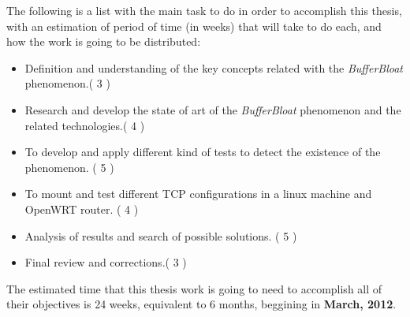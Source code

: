 The following is a list with the main task to do in order to accomplish this thesis, with an estimation of period of time (in weeks) that will take to do each, and how the work is going to be distributed:
\begin{itemize}
\item Definition and understanding of the key concepts related with the \textit{BufferBloat} phenomenon.( 3 )
\item Research and develop the state of art of the \textit{BufferBloat} phenomenon and the related technologies.( 4 )
\item To develop and apply different kind of tests to detect the existence of the phenomenon. ( 5  )
\item To mount and test different TCP configurations in a linux machine and OpenWRT router. ( 4  )
\item Analysis of results and search of possible solutions. ( 5  )
\item Final review and corrections.( 3  )
\end{itemize}

The estimated time that this thesis work is going to need to accomplish all of their objectives is 24 weeks, equivalent to 6 months, beggining in \textbf{March, 2012}.

